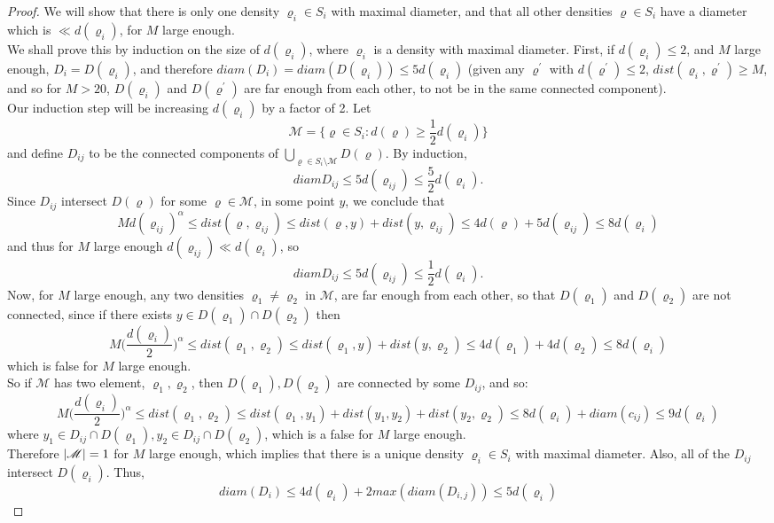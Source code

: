 \documentclass[11pt,reqno]{article}
\DeclarePairedDelimiter\abs{\lvert}{\rvert}%
\theoremstyle{definition}
\numberwithin{equation}{section}
\begin{document}
\begin{proof}
We will show that there is only one density $\varrho_i \in S_i$ with maximal diameter, and that all other densities $\varrho \in S_i$ have a diameter which is $\ll d(\varrho_i)$, for $M$ large enough.\\
We shall prove this by induction on the size of $d(\varrho_i)$, where $\varrho_i$ is a density with maximal diameter. First, if $d(\varrho_i) \leq 2$, and $M$ large enough, $D_i = D(\varrho_i)$, and therefore $diam(D_i) = diam(D(\varrho_i)) \leq 5d(\varrho_i)$ (given any $\varrho^\prime$ with $d(\varrho^\prime) \leq 2$, $dist(\varrho_i,\varrho^\prime) \geq M$, and so for $M>20$, $D(\varrho_i)$ and $D(\varrho^\prime)$ are far enough from each other, to not be in the same connected component).\\
Our induction step will be increasing $d(\varrho_i)$ by a factor of 2. Let
$$
\mathscr{M} = \{ \varrho \in S_i: d(\varrho) \geq \frac{1}{2}d(\varrho_i) \}
$$
and define $D_{ij}$ to be the connected components of $ \bigcup_{\varrho \in S_i \setminus \mathscr{M}} D(\varrho)$. By induction, 
$$
diamD_{ij} \leq 5d(\varrho_{ij}) \leq \frac{5}{2} d(\varrho_i).
$$
Since $D_{ij}$ intersect $D(\varrho)$ for some $\varrho \in \mathscr{M}$, in some point $y$, we conclude that
$$
Md(\varrho_{ij})^\alpha \leq dist(\varrho, \varrho_{ij}) \leq 
dist(\varrho, y) + dist(y, \varrho_{ij}) \leq 4d(\varrho) + 5d(\varrho_{ij}) \leq 8d(\varrho_i)
$$
and thus for $M$ large enough $d(\varrho_{ij}) \ll d(\varrho_i)$, so
$$
diamD_{ij} \leq 5d(\varrho_{ij}) \leq \frac{1}{2} d(\varrho_i).
$$
Now, for $M$ large enough, any two densities $\varrho_1 \neq \varrho_2$ in $\mathscr{M}$, are far enough from each other, so that $D(\varrho_1)$ and $D(\varrho_2)$ are not connected, since if there exists $y \in D(\varrho_1)\cap D(\varrho_2)$ then
$$
M\Big( \frac{d(\varrho_i)}{2} \Big)^\alpha \leq dist(\varrho_1, \varrho_2) \leq dist(\varrho_1, y) + dist(y, \varrho_2) \leq 4d(\varrho_1) + 4d(\varrho_2) \leq 8d(\varrho_i)
$$
which is false for $M$ large enough.\\
So if $\mathscr{M}$ has two element, $\varrho_1, \varrho_2$, then $D(\varrho_1), D(\varrho_2)$ are connected by some $D_{ij}$, and so:
$$
M\Big( \frac{d(\varrho_i)}{2} \Big)^\alpha \leq dist(\varrho_1, \varrho_2) \leq dist(\varrho_1, y_1) + dist(y_1, y_2) + dist(y_2, \varrho_2) \leq 8d(\varrho_i) + diam(c_{ij}) \leq 9d(\varrho_i)
$$
where $y_1 \in D_{ij} \cap D(\varrho_1), y_2 \in D_{ij} \cap D(\varrho_2)$, which is a false for $M$ large enough.\\
Therefore $\abs{\mathscr{M}} = 1$ for $M$ large enough, which implies that there is a unique density $\varrho_i \in S_i$ with maximal diameter. Also, all of the $D_{ij}$ intersect $D(\varrho_i)$. Thus,
$$
diam(D_i) \leq 4d(\varrho_i) + 2max(diam(D_{i,j})) \leq 5d(\varrho_i)
$$
\end{proof}
\end{document}
